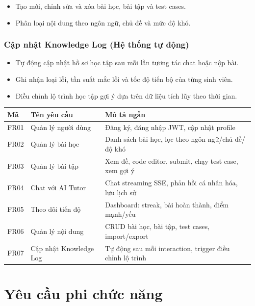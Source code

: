 \documentclass[../main.tex]{subfiles}
\begin{document}
\begin{itemize}
    \item Tạo mới, chỉnh sửa và xóa bài học, bài tập và test cases.
    \item Phân loại nội dung theo ngôn ngữ, chủ đề và mức độ khó.
\end{itemize}

\subsubsection{Cập nhật Knowledge Log (Hệ thống tự động)}

\begin{itemize}
    \item Tự động cập nhật hồ sơ học tập sau mỗi lần tương tác chat hoặc nộp bài.
    \item Ghi nhận loại lỗi, tần suất mắc lỗi và tốc độ tiến bộ của từng sinh viên.
    \item Điều chỉnh lộ trình học tập gợi ý dựa trên dữ liệu tích lũy theo thời gian.
\end{itemize}


{
\renewcommand{\arraystretch}{1.5}
\begin{tabularx}{\textwidth}{|p{2.0cm}|>{\raggedright\arraybackslash}p{4cm}|>{\raggedright\arraybackslash}X|}
\caption{Danh sách yêu cầu chức năng}
\label{tab:danh-sach-yeu-cau-chuc-nang}
\\
\hline
\textbf{Mã} & \textbf{Tên yêu cầu} & \textbf{Mô tả ngắn} \\
\hline
FR01 & Quản lý người dùng & Đăng ký, đăng nhập JWT, cập nhật profile \\
\hline
FR02 & Quản lý bài học & Danh sách bài học, lọc theo ngôn ngữ/chủ đề/độ khó \\
\hline
FR03 & Quản lý bài tập & Xem đề, code editor, submit, chạy test case, xem gợi ý \\
\hline
FR04 & Chat với AI Tutor & Chat streaming SSE, phản hồi cá nhân hóa, lưu lịch sử \\
\hline
FR05 & Theo dõi tiến độ & Dashboard: streak, bài hoàn thành, điểm mạnh/yếu \\
\hline
FR06 & Quản lý nội dung & CRUD bài học, bài tập, test cases, import/export \\
\hline
FR07 & Cập nhật Knowledge Log & Tự động sau mỗi interaction, trigger điều chỉnh lộ trình \\
\hline
\end{tabularx}
}

\section{Yêu cầu phi chức năng}
\end{document}
